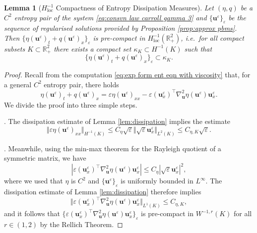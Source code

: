 \documentclass[11pt,a4paper,reqno]{amsart}
\numberwithin{equation}{section}
\newtheorem{lemma}{Lemma}[section]
\theoremstyle{definition}
\theoremstyle{remark}
\newcommand{\bu}{\mathbf{u}}
\newcommand{\loc}{\mathrm{loc}}
\renewcommand{\leq}{\leqslant}
\begin{document}
{\begin{lemma}[$H^{-1}_\loc$ Compactness of Entropy Dissipation Measures]\label{lem:H-1 cpct}
    Let $(\eta,q)$ be a $C^2$ entropy pair of the system \eqref{eq:consvn law carroll gamma 3} and $\{\bu^\varepsilon\}_\varepsilon$ be the sequence of regularised solutions provided by Proposition \ref{prop:approx pbms}. Then $\big\{\eta(\bu^\varepsilon)_t + q(\bu^\varepsilon)_x \big\}_\varepsilon$ is pre-compact in $H^{-1}_\loc(\mathbb{R}^2_+)$, \textit{i.e.}~for all compact subsets $K \subset \mathbb{R}^2_+$ there exists a compact set $\kappa_K \subset H^{-1}(K)$ such that 
    \begin{equation*}
        \big\{\eta(\bu^\varepsilon)_t + q(\bu^\varepsilon)_x \big\}_\varepsilon \subset \kappa_K. 
    \end{equation*}
\end{lemma}

\begin{proof}
    Recall from the computation \eqref{eq:exp form ent eqn with viscosity} that, for a general $C^2$ entropy pair, there holds 
    \begin{equation}\label{eq:general ent pair dissipation}
    \eta(\bu^\varepsilon)_t + q(\bu^\varepsilon)_x = \varepsilon\eta(\bu^\varepsilon)_{xx} - \varepsilon(\bu^\varepsilon_x)^\intercal \nabla^2_\bu \eta(\bu^\varepsilon) \bu_x^\varepsilon. 
\end{equation}
We divide the proof into three simple steps. 

\smallskip 
{}. The dissipation estimate of Lemma \ref{lem:dissipation} implies the estimate
\begin{equation}\label{eq:first term cpctness}
    \Vert \varepsilon \eta(\bu^\varepsilon)_{xx} \Vert_{H^{-1}(K)} \leq C_\eta \sqrt{\varepsilon} \Vert \sqrt{\varepsilon}\bu^\varepsilon_{x} \Vert_{L^2(K)} \leq C_{\eta,K} \sqrt{\varepsilon}. 
\end{equation}

\smallskip 
{}. Meanwhile, using the min-max theorem for the Rayleigh quotient of a symmetric matrix, we have
    \begin{equation}\label{eq:rayleigh quotient}
        |\varepsilon(\bu^\varepsilon_x)^\intercal \nabla^2_\bu \eta(\bu^\varepsilon) \bu_x^\varepsilon| \leq C_\eta |\sqrt{\varepsilon} \bu^\varepsilon_x|^2, 
    \end{equation}
   where we used that $\eta$ is $C^2$ and $\{\bu^\varepsilon\}_\varepsilon$ is uniformly bounded in $L^\infty$. The dissipation estimate of Lemma \ref{lem:dissipation} therefore implies 
    \begin{equation}\label{eq:second term cpctness}
        \Vert \varepsilon(\bu^\varepsilon_x)^\intercal \nabla^2_\bu \eta(\bu^\varepsilon) \bu_x^\varepsilon \Vert_{L^1(K)} \leq C_{\eta,K}, 
    \end{equation}
  and it follows that $\{\varepsilon(\bu^\varepsilon_x)^\intercal \nabla^2_\bu \eta(\bu^\varepsilon) \bu_x^\varepsilon \}_\varepsilon$ is pre-compact in $W^{-1,r}(K)$ for all $r \in (1,2)$ by the Rellich Theorem. 


\end{proof}}
\end{document}
